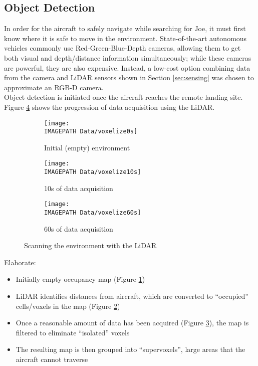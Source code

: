 \subsection{Object Detection}
In order for the aircraft to safely navigate while searching for Joe, it must first know where it is safe to move in the environment. State-of-the-art autonomous vehicles commonly use Red-Green-Blue-Depth cameras, allowing them to get both visual and depth/distance information simultaneously; while these cameras are powerful, they are also expensive. Instead, a low-cost option combining data from the camera and LiDAR sensors shown in Section \ref{sec:sensing} was chosen to approximate an RGB-D camera.\\

Object detection is initiated once the aircraft reaches the remote landing site. Figure \ref{fig:scan} shows the progression of data acquisition using the LiDAR.\\

\begin{figure}
	\centering
	\begin{subfigure}[b]{0.50\textwidth}
		\texttt{[image: \\IMAGEPATH Data/voxelize0s]}
		\caption{Initial (empty) environment}
		\label{fig:scaninit}
	\end{subfigure}
	
	\begin{subfigure}[b]{0.50\textwidth}
		\texttt{[image: \\IMAGEPATH Data/voxelize10s]}
		\caption{10s of data acquisition}
		\label{fig:scanten}
	\end{subfigure}
	
	\begin{subfigure}[b]{0.50\textwidth}
		\texttt{[image: \\IMAGEPATH Data/voxelize60s]}
		\caption{60s of data acquisition}
		\label{fig:scanminute}
	\end{subfigure}
	\caption{Scanning the environment with the LiDAR}
	\label{fig:scan}
\end{figure}

Elaborate:
\begin{itemize}
	\item Initially empty occupancy map (Figure \ref{fig:scaninit})
	\item LiDAR identifies distances from aircraft, which are converted to ``occupied'' cells/voxels in the map (Figure \ref{fig:scanten})
	\item Once a reasonable amount of data has been acquired (Figure \ref{fig:scanminute}), the map is filtered to eliminate ``isolated'' voxels
	\item The resulting map is then grouped into ``supervoxels'', large areas that the aircraft cannot traverse
\end{itemize}